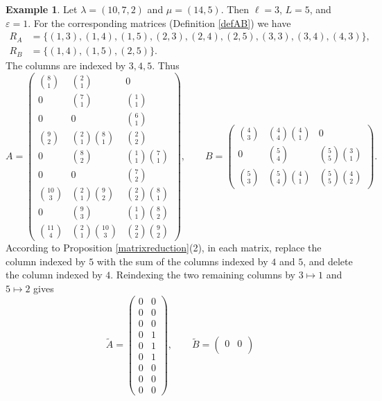 \documentclass[11pt]{amsart}
\theoremstyle{remark}
\theoremstyle{definition}
\newtheorem{example}[theorem]{Example}
\newcommand{\la}{\lambda}
\numberwithin{equation}{section}
\begin{document}
\begin{example}
	Let $\la=(10,7,2)$ and $\mu=(14,5)$. Then $\ell=3$, $L=5$,
	and $\varepsilon=1$. For the corresponding matrices (Definition \ref{defAB}) we have
	\begin{align*}
		R_A&=\{(1,3),(1,4),(1,5),(2,3),(2,4),(2,5),(3,3),(3,4),(4,3)\},\\
		R_B&=\{(1,4),(1,5),(2,5)\}.
	\end{align*}
	The columns are indexed by $3,4,5$. Thus
	\[
	A=\begin{pmatrix}
		\binom{8}{1}&\binom{2}{1}&0\\[3pt]
		0&\binom{7}{1}&\binom{1}{1}\\[3pt]
		0&0&\binom{6}{1}\\[3pt]
		\binom{9}{2}&\binom{2}{1}\binom{8}{1}&\binom{2}{2}\\[3pt]
		0&\binom{8}{2}&\binom{1}{1}\binom{7}{1}\\[3pt]
		0&0&\binom{7}{2}\\[3pt]
		\binom{10}{3}&\binom{2}{1}\binom{9}{2}&\binom{2}{2}\binom{8}{1}\\[3pt]
		0&\binom{9}{3}&\binom{1}{1}\binom{8}{2}\\[3pt]
		\binom{11}{4}&\binom{2}{1}\binom{10}{3}&\binom{2}{2}\binom{9}{2}
	\end{pmatrix},
	\qquad
	B=\begin{pmatrix}
		\binom{4}{3}&\binom{4}{4}\binom{4}{1}&0\\[3pt]
		0&\binom{5}{4}&\binom{5}{5}\binom{3}{1}\\[3pt]
		\binom{5}{3}&\binom{5}{4}\binom{4}{1}&\binom{5}{5}\binom{4}{2}
	\end{pmatrix}.
	\]
	According to Proposition \ref{matrixreduction}(2), in each matrix, replace the column indexed by $5$ with the sum
	of the columns indexed by $4$ and $5$, and delete the column
	indexed by $4$. Reindexing the two remaining columns by
	$3\mapsto 1$ and $5\mapsto 2$ gives
	\[
	\widetilde A=\begin{pmatrix}
		0&0\\
		0&0\\
		0&0\\
		0&1\\
		0&1\\
		0&1\\
		0&0\\
		0&0\\
		0&0
	\end{pmatrix},
	\qquad
	\widetilde B=\begin{pmatrix}
		0&0\\

\end{pmatrix}\]
\end{example}
\end{document}
